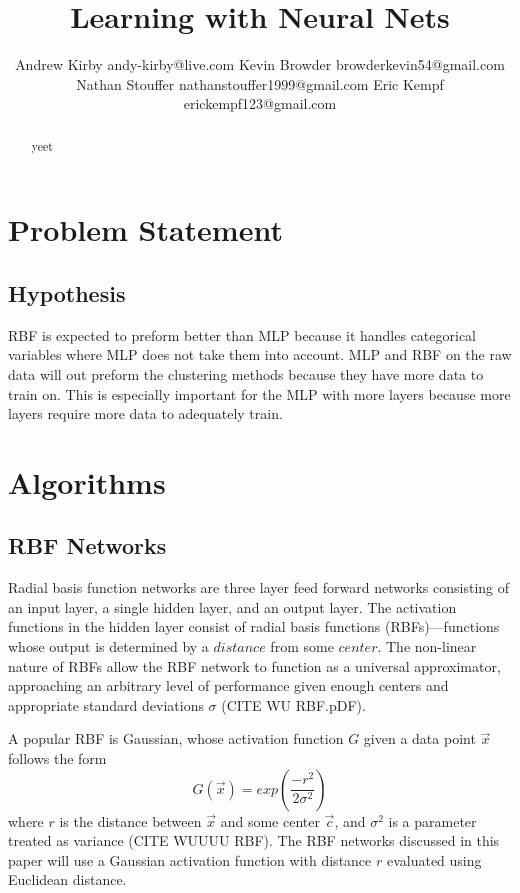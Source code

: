 \documentclass[twoside,11pt]{article}
\begin{document}
\title{Learning with Neural Nets}

\author{\name Andrew Kirby \email andy-kirby@live.com \AND
		\name Kevin Browder \email browderkevin54@gmail.com \AND
		\name Nathan Stouffer \email nathanstouffer1999@gmail.com \AND
		\name Eric Kempf \email erickempf123@gmail.com }

\maketitle

\begin{abstract}
yeet
\end{abstract}

\section{Problem Statement}

\subsection*{Hypothesis}
RBF is expected to preform better than MLP because it handles categorical variables where MLP does not take them into account. MLP and RBF on the raw data will out preform the clustering methods because they have more data to train on. This is especially important for the MLP with more layers because more layers require more data to adequately train.
\section{Algorithms}
\subsection{RBF Networks}
	Radial basis function networks are three layer feed forward networks consisting of an input layer, a single hidden layer, and an output layer. The activation functions in the hidden layer consist of radial basis functions (RBFs)---functions whose output is determined by a $distance$ from some $center$. The non-linear nature of RBFs allow the RBF network to function as a universal approximator, approaching an arbitrary level of performance given enough centers and appropriate standard deviations $\sigma$ (CITE WU RBF.pDF). %
	
	A popular RBF is Gaussian, whose activation function $G$ given a data point $\vec{x}$ follows the form
	$$G(\vec{x}) = exp({\frac{-r^2}{2\sigma^2}})$$
	where $r$ is the distance between $\vec x$ and some center $\vec c$, and $\sigma^2$ is a parameter treated as variance (CITE WUUUU RBF). The RBF networks discussed in this paper will use a Gaussian activation function with distance $r$ evaluated using Euclidean distance.
	
\end{document}
